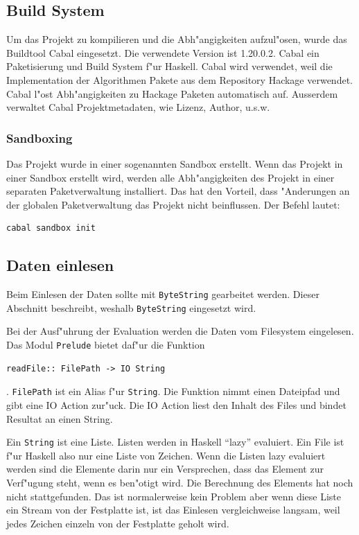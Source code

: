 \documentclass[a4paper, 12pt]{article}
\begin{document}
\subsection{Build System}
\label{sec:cabal}

Um das Projekt zu kompilieren und die Abh"angigkeiten aufzul"osen, wurde das Buildtool Cabal eingesetzt. Die verwendete Version ist 1.20.0.2. Cabal ein Paketisierung und Build System f"ur Haskell. Cabal wird verwendet, weil die Implementation der Algorithmen Pakete aus dem Repository Hackage verwendet. Cabal l"ost Abh"angigkeiten zu Hackage Paketen automatisch auf. Ausserdem verwaltet Cabal Projektmetadaten, wie Lizenz, Author, u.s.w.

\subsubsection{Sandboxing}
\label{sec:sanboxing}

Das Projekt wurde in einer sogenannten Sandbox erstellt. Wenn das Projekt in einer Sandbox erstellt wird, werden alle Abh"angigkeiten des Projekt in einer separaten Paketverwaltung installiert. Das hat den Vorteil, dass "Anderungen an der globalen Paketverwaltung das Projekt nicht beinflussen. Der Befehl lautet:
\begin{verbatim}
cabal sandbox init
\end{verbatim}

\subsection{Daten einlesen}
\label{sec:readio}

Beim Einlesen der Daten sollte mit \verb|ByteString| gearbeitet werden. Dieser Abschnitt beschreibt, weshalb \verb|ByteString| eingesetzt wird.

Bei der Ausf"uhrung der Evaluation werden die Daten vom Filesystem eingelesen. Das Modul \verb|Prelude| bietet daf"ur die Funktion
\begin{verbatim}
readFile:: FilePath -> IO String
\end{verbatim}
 . \verb|FilePath| ist ein Alias f"ur \verb|String|. Die Funktion nimmt einen Dateipfad und gibt eine IO Action zur"uck. Die IO Action liest den Inhalt des Files und bindet Resultat an einen String.

Ein \verb|String| ist eine Liste. Listen werden in Haskell ``lazy'' evaluiert. Ein File ist f"ur Haskell also nur eine Liste von Zeichen. Wenn die Listen lazy evaluiert werden sind die Elemente darin nur ein Versprechen, dass das Element zur Verf"ugung steht, wenn es ben"otigt wird. Die Berechnung des Elements hat noch nicht stattgefunden. Das ist normalerweise kein Problem aber wenn diese Liste ein Stream von der Festplatte ist, ist das Einlesen vergleichweise langsam, weil jedes Zeichen einzeln von der Festplatte geholt wird.
\end{document}
